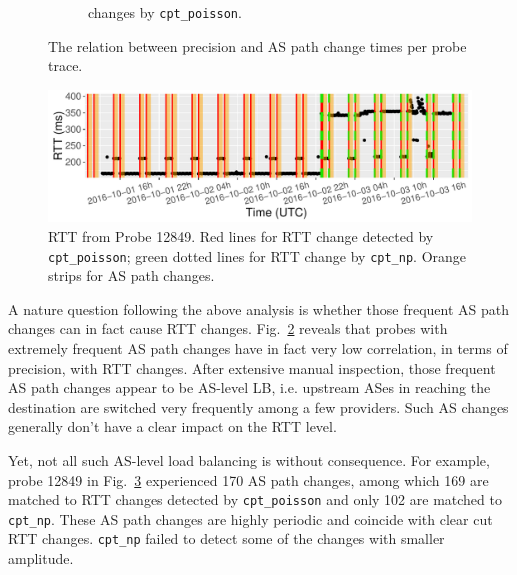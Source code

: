 \begin{figure}[!htb]
\begin{subfigure}[b]{.48\textwidth}
	\caption{\footnotesize changes by \texttt{cpt\_poisson}.}
	\label{fig:as_path_ch_precision_poisson}
	\end{subfigure}
\caption{The relation between precision and AS path change times per probe trace.}
\label{fig:as_path_ch_precision}
\end{figure}

\begin{figure}[!htb]
\centering
\includegraphics[width=.96\textwidth]{gfx/chap4/case_12849.pdf}
\caption{RTT from Probe 12849. Red lines for RTT change detected by \texttt{cpt\_poisson}; green dotted lines for RTT change by \texttt{cpt\_np}. Orange strips for AS path changes.}
\label{fig:case_12849_rtt}
\end{figure}
A nature question following the above analysis is whether those frequent AS path changes can in fact cause RTT changes.
Fig.~\ref{fig:as_path_ch_precision} reveals that probes with extremely frequent AS path changes have in fact very low correlation, in terms of precision, with RTT changes.
After extensive manual inspection, those frequent AS path changes appear to be AS-level LB, i.e. upstream ASes in reaching the destination are switched very frequently among a few providers.
Such AS changes generally don't have a clear impact on the RTT level. 


Yet, not all such AS-level load balancing is without consequence. For example, probe 12849 in Fig.~\ref{fig:case_12849_rtt} experienced 170 AS path changes, among which 169 are matched to RTT changes detected by \texttt{cpt\_poisson} and only 102 are matched to \texttt{cpt\_np}.
These AS path changes are highly periodic and coincide with clear cut RTT changes.
\texttt{cpt\_np} failed to detect some of the changes with smaller amplitude.

